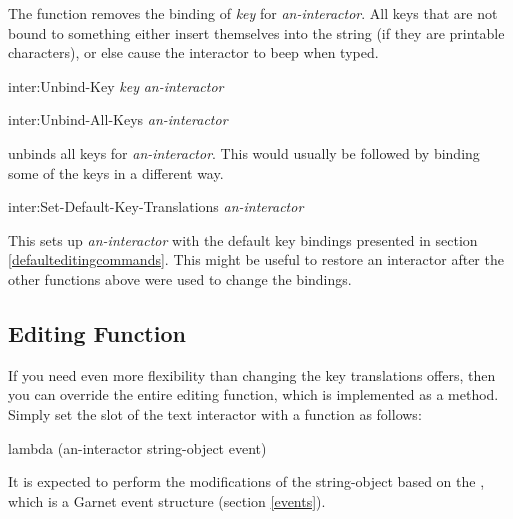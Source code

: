 The function  removes the binding of {\it key} for
{\it an-interactor}.  All keys that
are not bound to something either insert themselves into the string (if
they are printable characters), or else cause the interactor to beep when typed.

\begin{programexample}
inter:Unbind-Key {\it key} {\it an-interactor}\value{function}

inter:Unbind-All-Keys {\it an-interactor}\value{function}
\end{programexample}
 unbinds all keys for {\it an-interactor}.  This
would usually be followed by binding some of the keys in a different way.

\begin{programexample}
inter:Set-Default-Key-Translations {\it an-interactor}\value{function}
\end{programexample}
This sets up {\it an-interactor} with the default key bindings presented in
section \ref{defaulteditingcommands}.  This might be useful to restore an
interactor after the other functions above were used to change the bindings.

\subsection{Editing Function}

If you need even more flexibility than changing the key translations
offers, then you can override the entire editing function, which is
implemented as a method.  Simply set the  slot of the text
interactor with a function as follows:
\begin{programexample}
lambda (an-interactor string-object event)
\end{programexample}
It is expected to perform the modifications of the string-object based on
the , which is a Garnet event structure (section \ref{events}).


